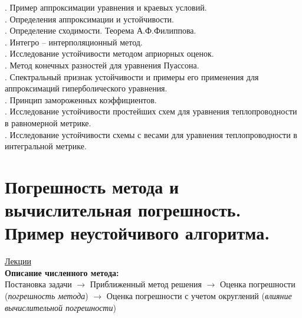 \documentclass[specialist, subf, href, colorlinks=true, 12pt, times, mtpro, final]{disser}
\theoremstyle{definition}
\begin{document}
{. Пример аппроксимации уравнения и краевых условий.\\
. Определения аппроксимации и устойчивости.\\
. Определение сходимости. Теорема А.Ф.Филиппова.\\
. Интегро -- интерполяционный метод.\\
. Исследование устойчивости методом априорных оценок.\\
. Метод конечных разностей для уравнения Пуассона.\\
. Спектральный признак устойчивости и примеры его применения для аппроксимаций гиперболического уравнения.\\
. Принцип замороженных коэффициентов.\\
. Исследование устойчивости простейших схем для уравнения теплопроводности в равномерной метрике.\\
. Исследование устойчивости схемы с весами для уравнения теплопроводности в интегральной метрике.\\
}

\section {Погрешность метода и вычислительная погрешность. Пример неустойчивого алгоритма.}
    \hyperlink {lects.1}{Лекции} \\
    \textbf{Описание численного метода:}\\
    Постановка задачи $\rightarrow$ Приближенный метод решения $\rightarrow$ Оценка погрешности (\textit{погрешность метода}) $\rightarrow$ Оценка погрешности с учетом округлений (\textit{влияние вычислительной погрешности})  
\end{document}
